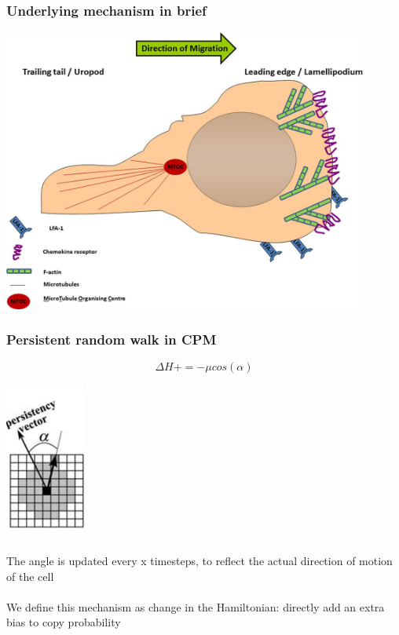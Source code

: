 \documentclass[compress]{beamer}
\begin{document}
\begin{frame}
\frametitle{Underlying mechanism in brief}   
\begin{center}
 \includegraphics[width=0.9\textwidth]{figures/actinmigration.jpg}\\
\end{center}
\end{frame}

\begin{frame}
\frametitle{Persistent random walk in CPM}   
\[\Delta H += -\mu cos(\alpha)\]
\begin{center}
 \includegraphics[width=0.2\textwidth]{figures/persistency.pdf}\\
\end{center}
The angle is updated every x timesteps, to reflect the actual direction of motion of the cell\\
~\\
We define this mechanism as change in the Hamiltonian: directly add an extra bias to copy probability 
\end{frame}
\end{document}
